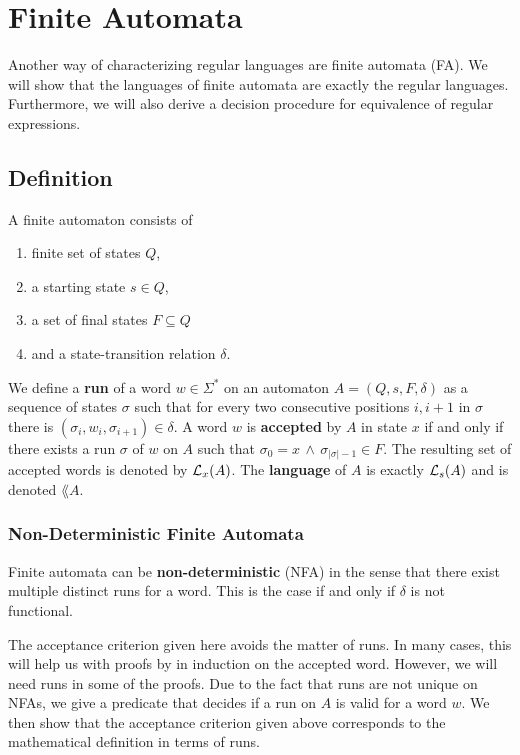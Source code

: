 
\chapter{Finite Automata}
\label{chap:FA}

Another way of characterizing regular languages are finite automata (FA)\cite{DBLP:books/daglib/0011126}. 
We will show that the languages of finite automata are exactly the regular languages. 
Furthermore, we will also derive a decision procedure for equivalence of regular expressions.

\section{Definition}
A finite automaton consists of
\begin{enumerate}
    \item
        finite set of states $Q$, 
    \item 
        a starting state $s \in Q$, 
    \item 
        a set of final states $F \subseteq Q$ 
    \item 
        and a state-transition relation $\delta$. 
\end{enumerate}

We define a \textbf{run} of a word $w \in \Sigma^*$ on an automaton $A = (Q, s, F, \delta)$ as a sequence of states $\sigma$ such that 
for every two consecutive positions $i,i+1$ in $\sigma$ there is 
$(\sigma_i, w_i, \sigma_{i+1}) \in \delta$.
A word $w$ is \textbf{accepted} by $A$ in state $x$ if and only if there exists a run $\sigma$ of $w$ on $A$ such that $\sigma_0 = x \, \wedge \, \sigma_{\vert\sigma\vert-1} \in F$.
The resulting set of accepted words is denoted by $\mathcal{L}_{x}(A)$.
The \textbf{language} of $A$ is exactly $\mathcal{L}_{s}(A)$ and is denoted $\lang{A}$. 

\subsection{Non-Deterministic Finite Automata}
Finite automata can be \textbf{non-deterministic} (NFA) in the sense that there exist multiple distinct runs for a word. 
This is the case if and only if $\delta$ is not functional.



The acceptance criterion given here avoids the matter of runs.
In many cases, this will help us with proofs by in induction on the accepted word.
However, we will need runs in some of the proofs.
Due to the fact that runs are not unique on NFAs, 
we give a predicate that decides if a run on $A$ is valid for a word $w$.
We then show that the acceptance criterion given above corresponds to the mathematical definition in terms of runs.

